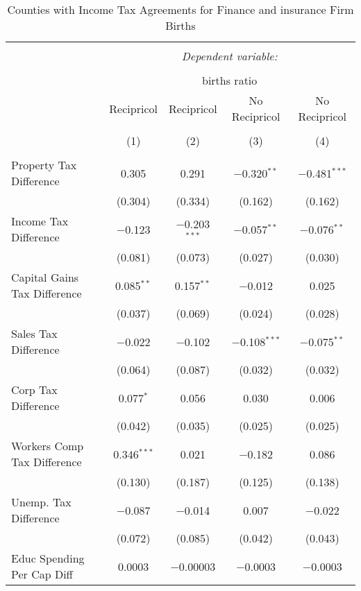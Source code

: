 
\begin{table}[!htbp] \centering 
  \caption{Counties with Income Tax Agreements for  Finance and insurance Firm Births} 
  \label{52agreement} 
\begin{tabular}{@{\extracolsep{5pt}}lcccc} 
\\[-1.8ex]\hline 
\hline \\[-1.8ex] 
 & \multicolumn{4}{c}{\textit{Dependent variable:}} \\ 
\cline{2-5} 
\\[-1.8ex] & \multicolumn{4}{c}{births ratio} \\ 
 & Recipricol & Recipricol & No Recipricol & No Recipricol \\ 
\\[-1.8ex] & (1) & (2) & (3) & (4)\\ 
\hline \\[-1.8ex] 
 Property Tax Difference & 0.305 & 0.291 & $-$0.320$^{**}$ & $-$0.481$^{***}$ \\ 
  & (0.304) & (0.334) & (0.162) & (0.162) \\ 
  Income Tax Difference & $-$0.123 & $-$0.203$^{***}$ & $-$0.057$^{**}$ & $-$0.076$^{**}$ \\ 
  & (0.081) & (0.073) & (0.027) & (0.030) \\ 
  Capital Gains Tax Difference & 0.085$^{**}$ & 0.157$^{**}$ & $-$0.012 & 0.025 \\ 
  & (0.037) & (0.069) & (0.024) & (0.028) \\ 
  Sales Tax Difference & $-$0.022 & $-$0.102 & $-$0.108$^{***}$ & $-$0.075$^{**}$ \\ 
  & (0.064) & (0.087) & (0.032) & (0.032) \\ 
  Corp Tax Difference & 0.077$^{*}$ & 0.056 & 0.030 & 0.006 \\ 
  & (0.042) & (0.035) & (0.025) & (0.025) \\ 
  Workers Comp Tax Difference & 0.346$^{***}$ & 0.021 & $-$0.182 & 0.086 \\ 
  & (0.130) & (0.187) & (0.125) & (0.138) \\ 
  Unemp. Tax Difference & $-$0.087 & $-$0.014 & 0.007 & $-$0.022 \\ 
  & (0.072) & (0.085) & (0.042) & (0.043) \\ 
  Educ Spending Per Cap Diff & 0.0003 & $-$0.00003 & $-$0.0003 & $-$0.0003 \\ 

\end{tabular}
\end{table}
